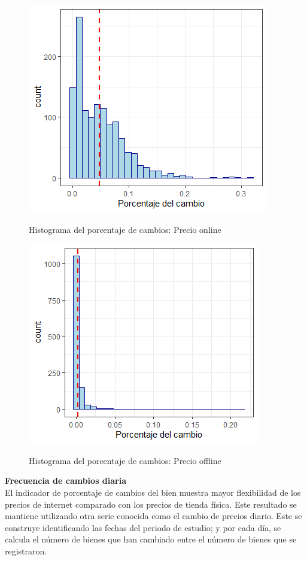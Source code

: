 \documentclass[12pt,a4paper,pdflatex]{article}
\begin{document}
\begin{figure}[!ht]
\centering
 \caption{Histograma del porcentaje de cambios: Precio online}
\includegraphics[scale=1.0]{cambio_producto_internet.png}
  \label{fig:Histograma del porcentaje de cambios: Precio online}
\end{figure}


\begin{figure}[!ht]
\centering
 \caption{Histograma del porcentaje de cambios: Precio offline}
\includegraphics[scale=1.0]{cambio_producto_normal.png}
  \label{fig:Histograma del porcentaje de cambios: Precio offline}
\end{figure}

\clearpage

\textbf{Frecuencia de cambios diaria}\\
El indicador de porcentaje de cambios del bien muestra mayor flexibilidad de los precios de internet comparado con los precios de tienda física. Este resultado se mantiene utilizando otra serie conocida como el cambio de precios diario. Este se construye identificando las fechas del periodo de estudio; y por cada día, se calcula el número de bienes que han cambiado entre el número de bienes que se registraron.
\end{document}
